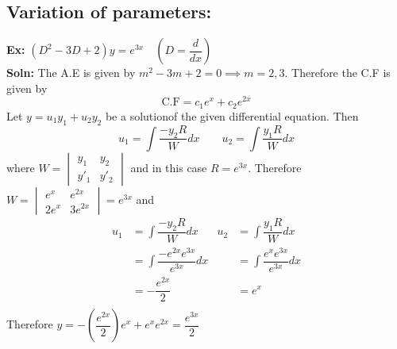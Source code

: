 \documentclass[a4paper, titlepage]{article}
\begin{document}
    \subsection{Variation of parameters: }
    \textbf{Ex: }$(D^2 - 3D + 2)y = e^{3x} \quad \left( D = \dfrac{d}{dx} \right)$ \hfill \\
    \textbf{Soln: }The A.E is given by $m^2 - 3m + 2 = 0 \implies
    m = 2,3$. Therefore the C.F is given by
    \[ \text{C.F} = c_1e^{x} + c_2e^{2x} \]
    Let $y = u_1y_1 + u_2y_2$ be a solutionof the given differential 
    equation. Then \[ 
        u_1 = \displaystyle\int \dfrac{-y_2R}{W} dx \qquad
        u_2 = \displaystyle\int \dfrac{y_1R}{W} dx
    \] where \( W = 
        \begin{vmatrix}
            y_1 & y_2 \\
            y'_1 & y'_2         
        \end{vmatrix} 
    \) and in this case $ R = e^{3x}$. Therefore 
    $
        W = \begin{vmatrix}
                e^{x} & e^{2x} \\
                2e^{x} & 3e^{2x}
            \end{vmatrix} = e^{3x} 
    $ 
    and 
    \begin{align*}
        u_1 &= \displaystyle\int \dfrac{-y_2R}{W} dx &
        u_2 &= \displaystyle\int \dfrac{y_1R}{W} dx \\
            &= \displaystyle\int \dfrac{-e^{2x}e^{3x}}{e^{3x}} dx &
            &= \displaystyle\int \dfrac{e^{x}e^{3x}}{e^{3x}} dx \\
            &= -\dfrac{e^{2x}}{2} & &=e^x \\
        \end{align*}
    Therefore $y = -\left( \dfrac{e^{2x}}{2} \right)e^x + e^xe^{2x} = \dfrac{e^{3x}}{2}$
\end{document}
